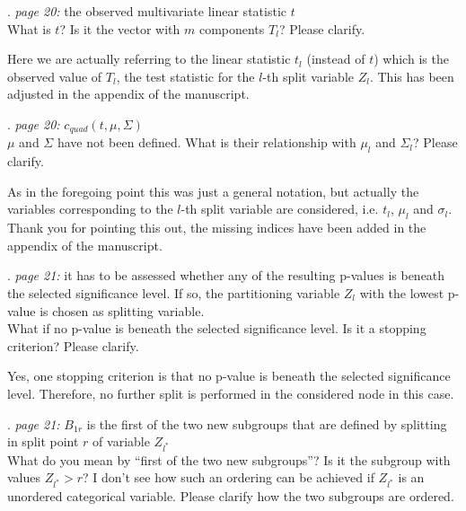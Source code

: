 \documentclass[american,foldmarks=false,noconfig]{uibklttr}
\newenvironment{review}{\fontshape{\itdefault}\fontseries{\bfdefault} \selectfont \smallskip}{\par}
\begin{document}
\begin{review}
17. {\color{quotecolor}\textit{page 20:} the observed 
multivariate linear statistic $t$}\\
What is $t$? Is it the vector with $m$ components $T_l$? 
Please clarify.
\end{review}

Here we are actually referring to the linear statistic $t_l$ (instead of $t$) 
which is the observed value of $T_l$, the test statistic for the $l$-th split 
variable $Z_l$. This has been adjusted in the appendix of the manuscript.

\begin{review}
18. {\color{quotecolor}\textit{page 20:} $c_{quad}(t, \mu, \Sigma)$}\\
$\mu$ and $\Sigma$ have not been defined. What is their relationship 
with $\mu_l$ and $\Sigma_l$? Please clarify.
\end{review}

As in the foregoing point this was just a general notation, but 
actually the variables corresponding to the $l$-th split variable 
are considered, i.e. $t_l$, $\mu_l$ and $\sigma_l$. Thank you for
pointing this out, the missing indices have been added in the
appendix of the manuscript.

\begin{review}
19. {\color{quotecolor}\textit{page 21:} it has to be assessed 
whether any of the resulting p-values is beneath the selected 
significance level. If so, the partitioning variable $Z_l$
with the lowest p-value is chosen as splitting variable.}\\
What if no p-value is beneath the selected significance level. 
Is it a stopping criterion? Please clarify.
\end{review}

Yes, one stopping criterion is that no p-value is beneath the 
selected significance level. Therefore, no further 
split is performed in the considered node in this case.

\begin{review}
20. {\color{quotecolor}\textit{page 21:} $B_{1r}$ is the first 
of the two new subgroups that are defined by splitting in split 
point $r$ of variable $Z_{l^{\ast}}$}\\
What do you mean by ``first of the two new subgroups''? Is it 
the subgroup with values $Z_{l^{\ast}} > r$? I don't see how 
such an ordering can be achieved if $Z_{l^{\ast}}$ is an 
unordered categorical variable. Please clarify how the two
subgroups are ordered.
\end{review}
\end{document}
